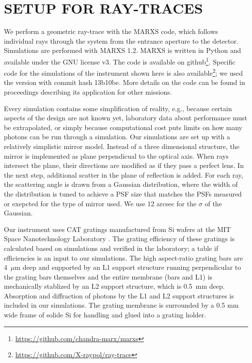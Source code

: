 \documentclass[]{spie}  %
\begin{document}
\section{SETUP FOR RAY-TRACES}
We perform a geometric ray-trace with the MARXS code, which follows individual rays through the system from the entrance aperture to the detector. Simulations are performed with MARXS 1.2\cite{marxs,marxs1.2}. MARXS is
written in Python and available under the GNU license v3. The code is available on github\footnote{\url{https://github.com/chandra-marx/marxs}}. Specific code for the simulations of the instrument shown here is also available\footnote{\url{https://github.com/X-raypol/ray-trace}}; we used the version with commit hash 13b10be. More details on the code can be found in proceedings describing its application for other missions\cite{10.1117/12.2525814,10.1117/12.2312678}.

Every simulation contains some simplification of reality, e.g., because certain aspects of the design are not known yet, laboratory data about performance must be extrapolated, or simply because computational cost puts limits on how many photons can be run through a simulation. Our simulations are set up with a relatively simplistic mirror model. Instead of a three dimensional structure, the mirror is implemented as plane perpendicual to the optical axis. When rays intersect the plane, their directions are modified as if they pass a perfect lens. In the next step, additional scatter in the plane of reflection is added. For each ray, the scattering angle is drawn from a Gaussian distribution, where the width of the distribution is tuned to achieve a PSF size that matches the PSFs measured or exepcted for the type of mirror used. We use 12 arcsec for the $\sigma$ of the Gaussian.

Our instrument uses CAT gratings manufactured from Si wafers at the MIT Space Nanotechnology Laboratory
\cite{Heilmann:11,doi:10.1117/12.2188525,10.1117/12.2314180,10.1117/12.2529354}. The grating efficiency of these gratings is calculated based on simulations and verified in the laboratory; a table if efficiencies is an input to our simulations. The high aspect-ratio grating bars are 4~$\mu$m deep and supported by an L1 support structure running perpendicular to the grating bars themselves and the entire membrane (bars and L1) is mechanically stablized by an L2 support structure, which is 0.5~mm deep. Absorption and diffraction of photons by the L1 and L2 support structures is included in our simulations. The grating membrane is surrounded by a 0.5 mm wide frame of solide Si for handling and glued into a grating holder.
\end{document}
